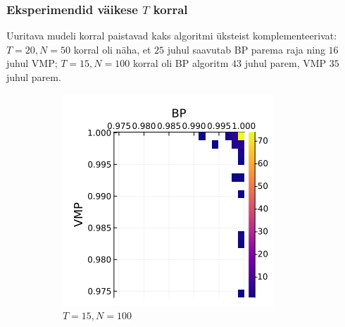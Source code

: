 \subsubsection{Eksperimendid väikese $T$ korral}

Uuritava mudeli korral paistavad kaks algoritmi üksteist komplementeerivat: $T=20,N=50$ korral oli näha, et $25$ juhul saavutab BP parema raja ning $16$ juhul VMP; $T=15,N=100$ korral oli BP algoritm $43$ juhul parem, VMP $35$ juhul parem.

\begin{figure}
\centering
\begin{subfigure}{.5\textwidth}
  \centering
  \includegraphics[width=1\linewidth]{uniform_dirichlet_percs_std125_t15.png}
  \caption{ $T = 15, N = 100$ }
  \label{fig:sub1}
\end{subfigure}%
\begin{subfigure}{.5\textwidth}
  \centering

\end{subfigure}
\end{figure}

